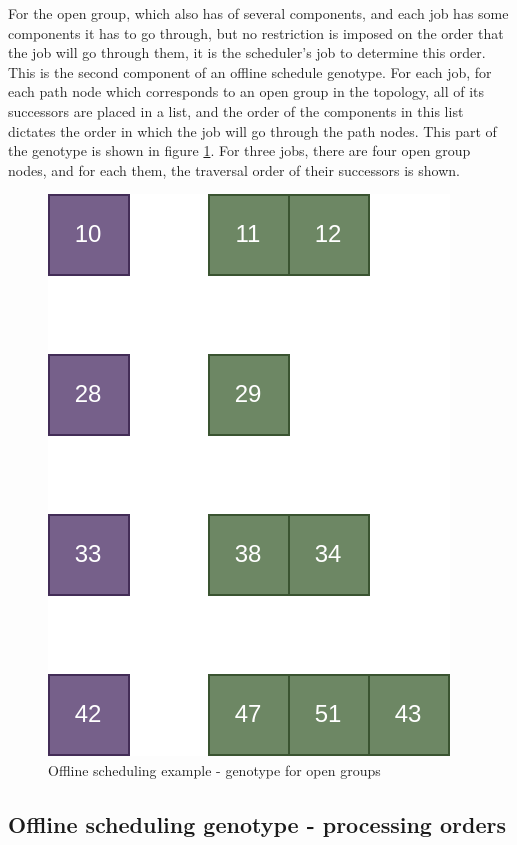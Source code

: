 For the open group, which also has of several components, and each job has some components it has to go through, but no restriction is imposed on the order that the job will go through them, it is the scheduler's job to determine this order. This is the second component of an offline schedule genotype. For each job, for each path node which corresponds to an open group in the topology, all of its successors are placed in a list, and the order of the components in this list dictates the order in which the job will go through the path nodes. This part of the genotype is shown in figure \ref{fig:offline_scheduling_genotype_open}. For three jobs, there are four open group nodes, and for each them, the traversal order of their successors is shown.

\begin{figure}[!htbp]
	\centering
	\includegraphics[scale=0.3]{../images/offline_scheduling_genotype_open.png}
	\caption{Offline scheduling example - genotype for open groups}
    \label{fig:offline_scheduling_genotype_open}
\end{figure}

\subsection{Offline scheduling genotype - processing orders}

